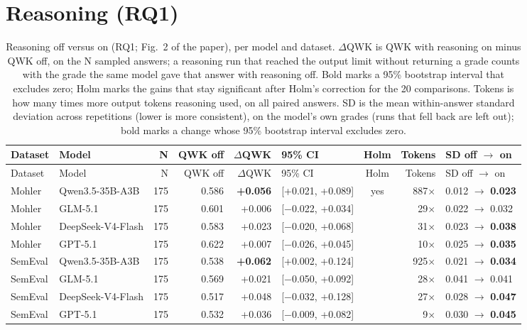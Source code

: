 \documentclass[10pt]{article}
\begin{document}
\section{Reasoning (RQ1)}
\begingroup\footnotesize
\begin{longtable}{llrrrlcrl}
\caption{Reasoning off versus on (RQ1; Fig.~2 of the paper), per model and dataset. $\Delta$QWK is QWK with reasoning on minus QWK off, on the N sampled answers; a reasoning run that reached the output limit without returning a grade counts with the grade the same model gave that answer with reasoning off. Bold marks a 95\% bootstrap interval that excludes zero; Holm marks the gains that stay significant after Holm's correction for the 20 comparisons. Tokens is how many times more output tokens reasoning used, on all paired answers. SD is the mean within-answer standard deviation across repetitions (lower is more consistent), on the model's own grades (runs that fell back are left out); bold marks a change whose 95\% bootstrap interval excludes zero.\label{tab:rq1supp}}\\
\hline
Dataset & Model & N & QWK off & $\Delta$QWK & 95\% CI & Holm & Tokens & SD off $\to$ on \\ \hline
\endfirsthead
\hline
Dataset & Model & N & QWK off & $\Delta$QWK & 95\% CI & Holm & Tokens & SD off $\to$ on \\ \hline
\endhead
Mohler & Qwen3.5-35B-A3B & 175 & 0.586 & \textbf{+0.056} & [+0.021, +0.089] & yes & 887$\times$ & 0.012 $\to$ \textbf{0.023} \\
Mohler & GLM-5.1 & 175 & 0.601 & +0.006 & [$-$0.022, +0.034] &  & 29$\times$ & 0.022 $\to$ 0.032 \\
Mohler & DeepSeek-V4-Flash & 175 & 0.583 & +0.023 & [$-$0.020, +0.068] &  & 31$\times$ & 0.023 $\to$ \textbf{0.038} \\
Mohler & GPT-5.1 & 175 & 0.622 & +0.007 & [$-$0.026, +0.045] &  & 10$\times$ & 0.025 $\to$ \textbf{0.035} \\
SemEval & Qwen3.5-35B-A3B & 175 & 0.538 & \textbf{+0.062} & [+0.002, +0.124] &  & 925$\times$ & 0.021 $\to$ \textbf{0.034} \\
SemEval & GLM-5.1 & 175 & 0.569 & +0.021 & [$-$0.050, +0.092] &  & 28$\times$ & 0.041 $\to$ 0.041 \\
SemEval & DeepSeek-V4-Flash & 175 & 0.517 & +0.048 & [$-$0.032, +0.128] &  & 27$\times$ & 0.028 $\to$ \textbf{0.047} \\
SemEval & GPT-5.1 & 175 & 0.532 & +0.036 & [$-$0.009, +0.082] &  & 9$\times$ & 0.030 $\to$ \textbf{0.045} \\

\end{longtable}
\end{document}
